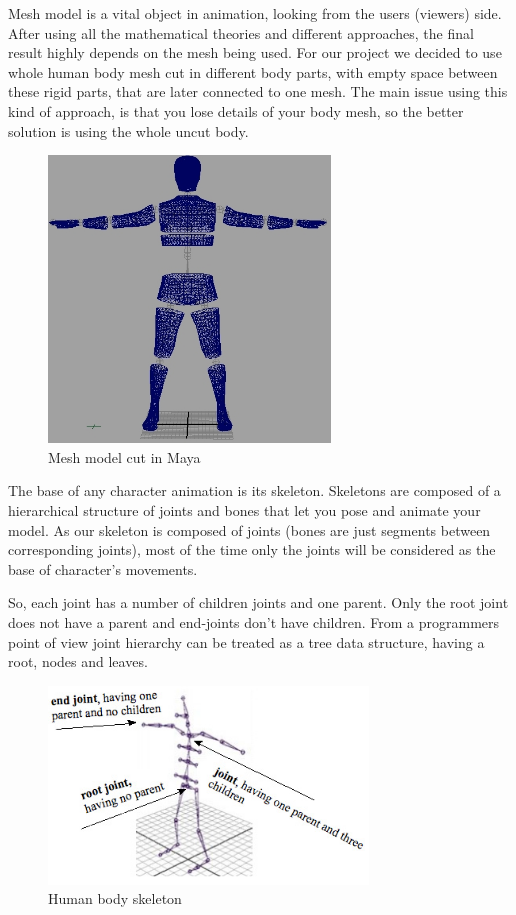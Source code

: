 \documentclass[times, 10pt,twocolumn]{article}
\begin{document}

Mesh model is a vital object in animation, looking from the users (viewers) side.
After using all the mathematical theories and different approaches, the final result
highly depends on the mesh being used.
For our project we decided to use whole human body mesh cut in different body parts,
with empty space between these rigid parts, that are later connected to one mesh.
The main issue using this kind of approach, is that you lose details of your body mesh,
so the better solution is using the whole uncut body.

\begin{figure}[H]
  \caption{Mesh model cut in Maya}
  \centering
  \includegraphics[width=75mm]{images/maya_cut.jpg}
\end{figure}


\label{Animating_human_body}

The base of any character animation is its skeleton. Skeletons are composed of a hierarchical structure of joints and bones that let you pose and animate your model. As our skeleton is composed of joints (bones are just  segments between corresponding joints), most of the time only the joints will be considered as the base of character's movements. 

So, each joint has a number of children joints and one parent. Only the root joint does not have a parent and end-joints don't have children. From a programmers point of view joint hierarchy can be treated as a tree data structure, having a root, nodes and leaves.

\begin{figure}[H]
  \caption{Human body skeleton}
  \centering
  \includegraphics[width=85mm]{images/bodySkeleton.jpg}
\end{figure}
\end{document}
